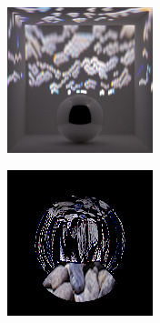 \begin{figure}[]
\begin{subfigure}{\textwidth}
\begin{subfigure}{0.19\textwidth}
            \centering
            \includegraphics[width=\textwidth]{images/04-experiment03/ball_dof/pebbles/stats_proj.jpg}
            \caption*{}
        \end{subfigure}
        \hfill
        \begin{subfigure}{0.19\textwidth}
            \centering
            \includegraphics[width=\textwidth]{images/04-experiment03/ball_dof/pebbles/pixel_im.jpg}

\end{subfigure}
\end{subfigure}
\end{figure}
